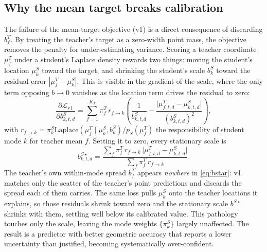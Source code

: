 \documentclass[conference]{IEEEtran}
\newcommand{\Lap}{\mathrm{Laplace}}
\newcommand{\loc}{\mu}
\newcommand{\scale}{b}
\begin{document}
\subsection{Why the mean target breaks calibration}
\label{sec:calib}
The failure of the mean-target objective (v1) 
is a direct consequence of discarding $\scale^T_f$. By treating the teacher's target 
as a zero-width point mass, the objective removes the penalty for 
under-estimating variance. Scoring a teacher
coordinate $\loc^T_f$ under a student's Laplace density rewards two things: moving the
student's location $\loc^S_k$ toward the target, and shrinking the student's scale
$\scale^S_k$ toward the residual error $|\loc^T_f - \loc^S_k|$. This is visible in the
gradient of the scale, where the only term opposing $\scale\to 0$ vanishes as the 
location term drives the residual to zero:
\begin{equation}
  \label{eq:v1grad}
  \frac{\partial \mathcal{L}_{\mathrm{v1}}}{\partial \scale^S_{k,t,d}}
   = \sum_{f=1}^{K_T}\pi^T_f\, r_{f\to k}
     \!\left(\frac{1}{\scale^S_{k,t,d}}
       - \frac{\lvert \loc^T_{f,t,d}-\loc^S_{k,t,d}\rvert}{(\scale^S_{k,t,d})^2}\right),
\end{equation}
with $r_{f\to k}=\pi^S_k\Lap(\loc^T_f\mid\loc^S_k,\scale^S_k)/p_S(\loc^T_f)$ the
responsibility of student mode $k$ for teacher mean $f$. Setting it to zero, every
stationary scale is
\begin{equation}
  \label{eq:bstar}
  \scale^{S\star}_{k,t,d}
   = \frac{\sum_f \pi^T_f\, r_{f\to k}\,\lvert \loc^T_{f,t,d}-\loc^S_{k,t,d}\rvert}
          {\sum_f \pi^T_f\, r_{f\to k}} .
\end{equation}
The teacher's own within-mode spread $\scale^T_f$ appears \emph{nowhere} in
\eqref{eq:bstar}: v1 matches only the scatter of the teacher's point predictions and
discards the spread each of them carries. The same loss pulls $\loc^S_k$ onto the 
teacher locations it explains, so those residuals shrink toward zero and the
stationary scale $\scale^{S\star}$ shrinks with them, settling well below its
calibrated value. This pathology touches only the scale, leaving the mode weights
$\{\pi^S_k\}$ largely unaffected. The
result is a predictor with better geometric accuracy that reports a lower uncertainty
than justified, becoming systematically over-confident.
\end{document}
